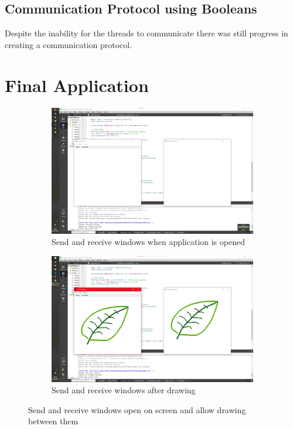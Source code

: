 \documentclass[10pt]{article}
\newcommand{\figsquish}{\vspace{-5mm}} %
\begin{document}
\begin{multicols*}{2}
\subsection{Communication Protocol using Booleans}
Despite the inability for the threads to communicate there was still progress in creating a communication protocol.



\section{Final Application}

\begin{figure}[H]
	\centering
	\begin{subfigure}[t]{0.48\columnwidth}

		\includegraphics[width=\columnwidth]{./application.png}
		\caption{Send and receive windows when application is opened}
		\label{fig:app}
	\end{subfigure}
	\hfill
	\begin{subfigure}[t]{0.48\columnwidth}

		\includegraphics[width=\columnwidth]{./application drawing.png}
		\caption{Send and receive windows after drawing}
		\label{fig:app-drawing}
	\end{subfigure}
	\caption{Send and receive windows open on screen and allow drawing between them}
	\label{fig:application}
\end{figure}
\figsquish


\end{multicols*}
\end{document}
